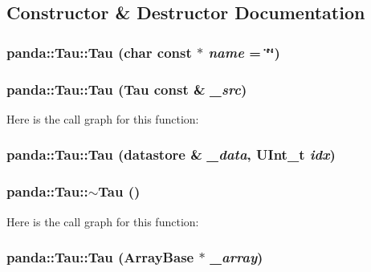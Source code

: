 \subsection{Constructor \& Destructor Documentation}
\hypertarget{classpanda_1_1Tau_a0b631016b750156f75c540643f0a1dba}{
\subsubsection[{Tau}]{\setlength{\rightskip}{0pt plus 5cm}panda::Tau::Tau (char const $\ast$ {\em name} = {\ttfamily \char`\"{}\char`\"{}})}}
\label{classpanda_1_1Tau_a0b631016b750156f75c540643f0a1dba}
\hypertarget{classpanda_1_1Tau_ae8c55cd74106fdc7513d24fa92ef1b2b}{
\subsubsection[{Tau}]{\setlength{\rightskip}{0pt plus 5cm}panda::Tau::Tau ({\bf Tau} const \& {\em \_\-src})}}
\label{classpanda_1_1Tau_ae8c55cd74106fdc7513d24fa92ef1b2b}


Here is the call graph for this function:\hypertarget{classpanda_1_1Tau_a435fada7333cc9a2cd51d051fe013aef}{
\subsubsection[{Tau}]{\setlength{\rightskip}{0pt plus 5cm}panda::Tau::Tau ({\bf datastore} \& {\em \_\-data}, \/  UInt\_\-t {\em idx})}}
\label{classpanda_1_1Tau_a435fada7333cc9a2cd51d051fe013aef}
\hypertarget{classpanda_1_1Tau_a3b9ea8c485a97fc1830810d5d111446a}{
\subsubsection[{$\sim$Tau}]{\setlength{\rightskip}{0pt plus 5cm}panda::Tau::$\sim$Tau ()}}
\label{classpanda_1_1Tau_a3b9ea8c485a97fc1830810d5d111446a}


Here is the call graph for this function:\hypertarget{classpanda_1_1Tau_a5c3641c6492f8403ba8a19d74ad3da75}{
\subsubsection[{Tau}]{\setlength{\rightskip}{0pt plus 5cm}panda::Tau::Tau ({\bf ArrayBase} $\ast$ {\em \_\-array})}}
\label{classpanda_1_1Tau_a5c3641c6492f8403ba8a19d74ad3da75}


